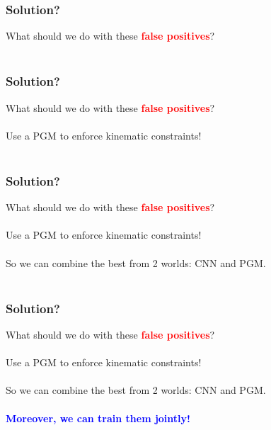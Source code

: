 \documentclass{beamer}
\newcommand\red[1]{\textcolor{red}{\textbf{#1}}}
\newcommand\blue[1]{\textcolor{blue}{\textbf{#1}}}
\begin{document}
    \begin{frame}[c]
    	\frametitle{Solution?}
    	\begin{center}
    		What should we do with these \red{false positives}? \\ \ \\
    	\end{center}
    \end{frame}
    
    \begin{frame}[c]
    	\frametitle{Solution?}
    	\begin{center}
    		What should we do with these \red{false positives}? \\ \ \\
    		Use a PGM to enforce kinematic constraints! \\ \ \\
    	\end{center}
    \end{frame}
    
    \begin{frame}[c]
    	\frametitle{Solution?}
    	\begin{center}
    		What should we do with these \red{false positives}? \\ \ \\
    		Use a PGM to enforce kinematic constraints! \\ \ \\
    		So we can combine the best from 2 worlds: CNN and PGM. \\ \ \\
    	\end{center}
    \end{frame}
    
    \begin{frame}[c]
    	\frametitle{Solution?}
    	\begin{center}
    		What should we do with these \red{false positives}? \\ \ \\
    		Use a PGM to enforce kinematic constraints! \\ \ \\
    		So we can combine the best from 2 worlds: CNN and PGM. \\ \ \\
    		\blue{Moreover, we can train them jointly!}
    	\end{center}
    \end{frame}
    
\end{document}
